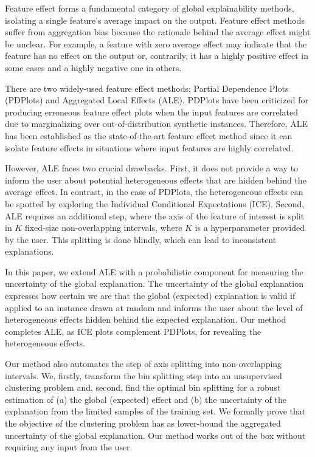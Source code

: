 \documentclass[twoside]{article}
\begin{document}
Feature effect forms a fundamental category of global explainability
methods, isolating a single feature's average impact on the
output. Feature effect methods suffer from aggregation bias because
the rationale behind the average effect might be unclear. For example,
a feature with zero average effect may indicate that the feature has
no effect on the output or, contrarily, it has a highly positive
effect in some cases and a highly negative one in others.

There are two widely-used feature effect methods; Partial Dependence
Plots (PDPlots)\citep{friedman2001greedy} and Aggregated Local Effects
(ALE)\citep{apley2020visualizing}. PDPlots have been criticized for
producing erroneous feature effect plots when the input features are
correlated due to marginalizing over out-of-distribution synthetic
instances. Therefore, ALE has been established as the state-of-the-art
feature effect method since it can isolate feature effects in
situations where input features are highly correlated.

However, ALE faces two crucial drawbacks. First, it does not provide a
way to inform the user about potential heterogeneous effects that are
hidden behind the average effect. In contrast, in the case of PDPlots,
the heterogeneous effects can be spotted by exploring the Individual
Conditional Expectations (ICE)\citep{goldstein2015peeking}. Second,
ALE requires an additional step, where the axis of the feature of
interest is split in \(K\) fixed-size non-overlapping intervals, where
\(K\) is a hyperparameter provided by the user. This splitting is done
blindly, which can lead to inconsistent explanations.

In this paper, we extend ALE with a probabilistic component for
measuring the uncertainty of the global explanation. The uncertainty
of the global explanation expresses how certain we are that the global
(expected) explanation is valid if applied to an instance drawn at
random and informs the user about the level of heterogeneous effects
hidden behind the expected explanation. Our method completes ALE, as
ICE plots complement PDPlots, for revealing the heterogeneous effects.

Our method also automates the step of axis splitting into
non-overlapping intervals. We, firstly, transform the bin splitting
step into an unsupervised clustering problem and, second, find the
optimal bin splitting for a robust estimation of (a) the global
(expected) effect and (b) the uncertainty of the explanation from the
limited samples of the training set. We formally prove that the
objective of the clustering problem has as lower-bound the aggregated
uncertainty of the global explanation. Our method works out of the box
without requiring any input from the user.
\end{document}
